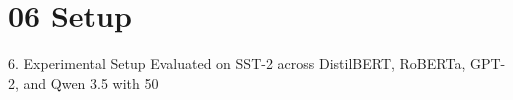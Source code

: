 \section{06 Setup}

 6. Experimental Setup
Evaluated on SST-2 across DistilBERT, RoBERTa, GPT-2, and Qwen 3.5 with 50%
